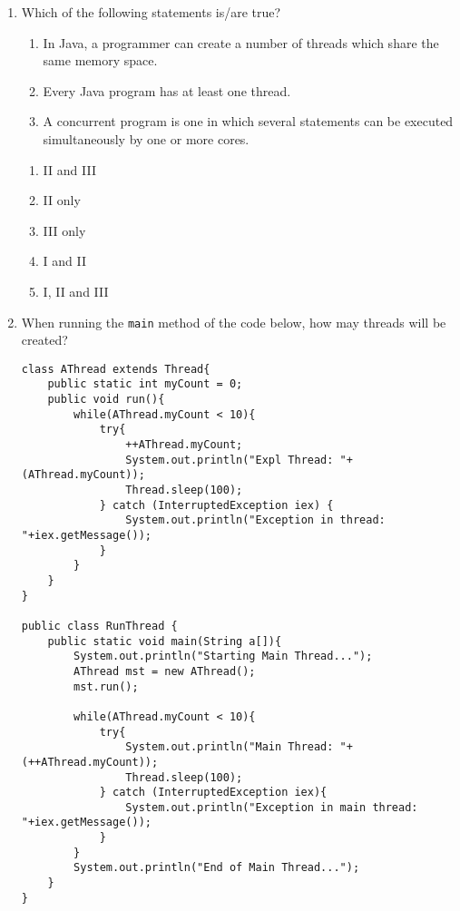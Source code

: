 \documentclass[CS180-S16-FinalExam.tex]{subfiles}
\begin{document}
\begin{enumerate}
\clearpage
\item Which of the following statements is/are true?
\begin{enumerate}[I]
\item In Java, a programmer can create a number of threads which share the same memory space.
\item Every Java program has at least one thread.
\item A concurrent program is one in which several statements can be executed simultaneously by one or more cores.
\end{enumerate}
\begin{enumerate}
\item II and III
\item II only
\item III only
\item I and II
\item I, II and III \ifdraft \Ans \fi
\end{enumerate}

\clearpage
\item When running the \texttt{main} method of the code below, how may threads will be created?  
\begin{lstlisting}
class AThread extends Thread{
    public static int myCount = 0;
    public void run(){
        while(AThread.myCount < 10){
            try{
                ++AThread.myCount;
                System.out.println("Expl Thread: "+(AThread.myCount));
                Thread.sleep(100);
            } catch (InterruptedException iex) {
                System.out.println("Exception in thread: "+iex.getMessage());
            }
        }
    }
}

public class RunThread {
    public static void main(String a[]){
        System.out.println("Starting Main Thread...");
        AThread mst = new AThread();
        mst.run();
        
        while(AThread.myCount < 10){
            try{
                System.out.println("Main Thread: "+(++AThread.myCount));
                Thread.sleep(100);
            } catch (InterruptedException iex){
                System.out.println("Exception in main thread: "+iex.getMessage());
            }
        }
        System.out.println("End of Main Thread...");
    }
}
\end{lstlisting}



\end{enumerate}
\end{document}
